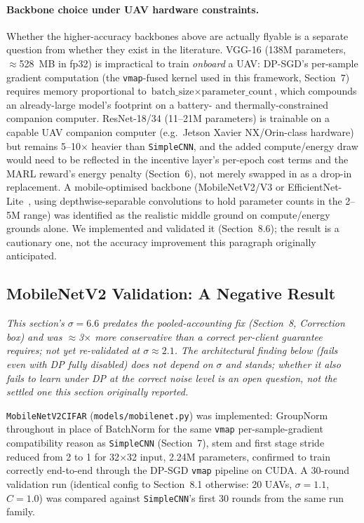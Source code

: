 \documentclass[12pt,a4paper]{article}
\begin{document}
\paragraph{Backbone choice under UAV hardware constraints.} Whether the
higher-accuracy backbones above are actually flyable is a separate question
from whether they exist in the literature. VGG-16 (138M parameters,
$\approx$528~MB in fp32) is impractical to train \emph{onboard} a UAV: DP-SGD's
per-sample gradient computation (the \texttt{vmap}-fused kernel used in this
framework, Section~7) requires memory proportional to
$\text{batch\_size}\times\text{parameter\_count}$, which compounds an
already-large model's footprint on a battery- and thermally-constrained
companion computer. ResNet-18/34 (11--21M parameters) is trainable on a
capable UAV companion computer (e.g.\ Jetson Xavier NX/Orin-class hardware) but
remains 5--10$\times$ heavier than \texttt{SimpleCNN}, and the added
compute/energy draw would need to be reflected in the incentive layer's
per-epoch cost terms and the MARL reward's energy penalty
(Section~6), not merely swapped in as a drop-in replacement. A mobile-optimised
backbone (MobileNetV2/V3 or EfficientNet-Lite~\cite{sandler2018}, using
depthwise-separable convolutions to hold parameter counts in the 2--5M range)
was identified as the realistic middle ground on compute/energy grounds
alone. We implemented and validated it (Section~8.6); the result is a
cautionary one, not the accuracy improvement this paragraph originally
anticipated.

\subsection{MobileNetV2 Validation: A Negative Result}
\label{sec:mobilenet-negative}

\emph{This section's $\sigma=6.6$ predates the pooled-accounting fix
(Section~8, Correction box) and was $\approx$3$\times$ more conservative
than a correct per-client guarantee requires; not yet re-validated at
$\sigma\approx2.1$. The architectural finding below (fails even with DP
fully disabled) does not depend on $\sigma$ and stands; whether it also
fails to learn \emph{under DP} at the correct noise level is an open
question, not the settled one this section originally reported.}

\texttt{MobileNetV2CIFAR} (\texttt{models/mobilenet.py}) was implemented:
GroupNorm throughout in place of BatchNorm for the same \texttt{vmap}
per-sample-gradient compatibility reason as \texttt{SimpleCNN}
(Section~7), stem and first stage stride reduced from 2 to 1 for 32$\times$32
input, 2.24M parameters, confirmed to train correctly end-to-end through the
DP-SGD \texttt{vmap} pipeline on CUDA. A 30-round validation run (identical
config to Section~8.1 otherwise: 20 UAVs, $\sigma=1.1$, $C=1.0$) was compared
against \texttt{SimpleCNN}'s first 30 rounds from the same run family.
\end{document}
